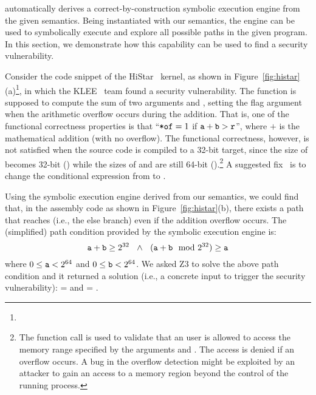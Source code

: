 \K automatically derives a correct-by-construction symbolic execution engine from the given semantics.
Being instantiated with our semantics, the engine can be used to symbolically execute and explore all possible paths in the given \ISA program.
In this section, we demonstrate how this capability can be used to find a  security vulnerability.



Consider the code snippet of the HiStar~\cite{HiStar:2006} kernel, as shown in Figure~\ref{fig:histar}(a)\footnote{}, in which the KLEE~\cite{Cadar:2008} team found a security vulnerability.
The  function is supposed to compute the sum of two arguments  and , setting the flag argument  when the arithmetic overflow occurs during the addition.
That is, one of the functional correctness properties is that ``$\texttt{*of} = 1$ if $\texttt{a} + \texttt{b} > \texttt{r}$'', where $+$ is the mathematical addition (with no overflow).
The functional correctness, however, is not satisfied when the source code is compiled to a 32-bit target,
since the size of  becomes 32-bit () while the sizes of  and  are still 64-bit ().\footnote{The function call  is used to validate that an user is allowed to access the memory range specified by the arguments  and .
The access is denied if an overflow occurs.
A bug in the overflow detection might be exploited by an attacker to gain an access to a memory region beyond the control of the running process.}
A suggested fix~\cite{Cadar:2008} is to change the conditional expression from  to .

Using the symbolic execution engine derived from our semantics, we could find  that, in the assembly code as shown in Figure~\ref{fig:histar}(b), there exists a path that reaches  (i.e., the else branch) even if the addition overflow occurs.
The (simplified) path condition provided by the symbolic execution engine is:
\[
\texttt{a} + \texttt{b} \ge 2^{32}
~~\wedge~~
(\texttt{a} + \texttt{b} \mod 2^{32}) \ge \texttt{a}
\]
where $0 \le \texttt{a} < 2^{64}$ and $0 \le \texttt{b} < 2^{64}$.
We asked Z3 to solve the above path condition and it returned a solution (i.e., a concrete input to trigger the security vulnerability):  =  and   = .



